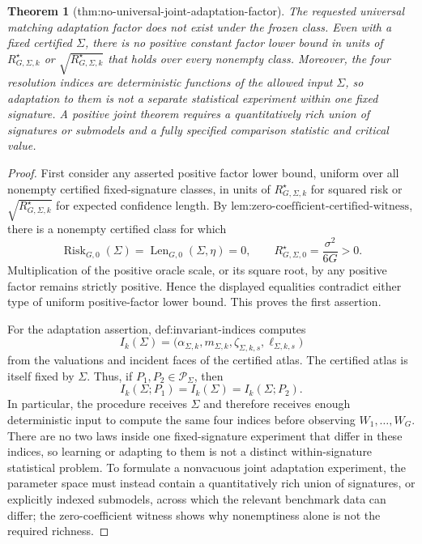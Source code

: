 \documentclass{article}
\newtheorem{theorem}{Theorem}
\begin{document}
\begin{theorem}[thm:no-universal-joint-adaptation-factor]\label{thm:no-universal-joint-adaptation-factor}
The requested universal matching adaptation factor does not exist under the frozen class. Even with a fixed certified \(\Sigma\), there is no positive constant factor lower bound in units of \(R_{G,\Sigma,k}^{\star}\) or \(\sqrt{R_{G,\Sigma,k}^{\star}}\) that holds over every nonempty class. Moreover, the four resolution indices are deterministic functions of the allowed input \(\Sigma\), so adaptation to them is not a separate statistical experiment within one fixed signature. A positive joint theorem requires a quantitatively rich union of signatures or submodels and a fully specified comparison statistic and critical value.
\end{theorem}
\begin{proof}
First consider any asserted positive factor lower bound, uniform over all nonempty certified fixed-signature classes, in units of \(R_{G,\Sigma,k}^{\star}\) for squared risk or \(\sqrt{R_{G,\Sigma,k}^{\star}}\) for expected confidence length. By \(\text{lem:zero-coefficient-certified-witness}\), there is a nonempty certified class for which
\[
 \operatorname{Risk}_{G,0}(\Sigma)
 =\operatorname{Len}_{G,0}(\Sigma,\eta)=0,
 \qquad
 R_{G,\Sigma,0}^{\star}=\frac{\sigma^2}{6G}>0.
\]
Multiplication of the positive oracle scale, or its square root, by any positive factor remains strictly positive. Hence the displayed equalities contradict either type of uniform positive-factor lower bound. This proves the first assertion.

For the adaptation assertion, \(\text{def:invariant-indices}\) computes
\[
 I_k(\Sigma)
 =\bigl(\alpha_{\Sigma,k},m_{\Sigma,k},
          \zeta_{\Sigma,k,s},\ell_{\Sigma,k,s}\bigr)
\]
from the valuations and incident faces of the certified atlas. The certified atlas is itself fixed by \(\Sigma\). Thus, if \(P_1,P_2\in\mathcal P_\Sigma\), then
\[
 I_k(\Sigma;P_1)=I_k(\Sigma)=I_k(\Sigma;P_2).
\]
In particular, the procedure receives \(\Sigma\) and therefore receives enough deterministic input to compute the same four indices before observing \(W_1,\ldots,W_G\). There are no two laws inside one fixed-signature experiment that differ in these indices, so learning or adapting to them is not a distinct within-signature statistical problem. To formulate a nonvacuous joint adaptation experiment, the parameter space must instead contain a quantitatively rich union of signatures, or explicitly indexed submodels, across which the relevant benchmark data can differ; the zero-coefficient witness shows why nonemptiness alone is not the required richness.


\end{proof}
\end{document}
